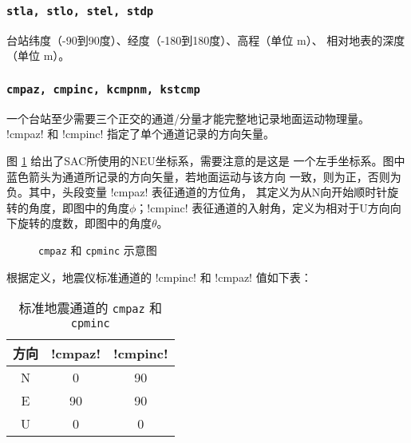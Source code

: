 \subsubsection{\texttt{stla, stlo, stel\dag, stdp\dag}}
台站纬度（-90到90度）、经度（-180到180度）、高程（单位 \si{m}）、
相对地表的深度（单位 \si{m}）。

\subsubsection{\texttt{cmpaz, cmpinc, kcmpnm, kstcmp}}
一个台站至少需要三个正交的通道/分量才能完整地记录地面运动物理量。
!cmpaz! 和 !cmpinc! 指定了单个通道记录的方向矢量。

图 \ref{fig:cmpaz-cmpinc} 给出了SAC所使用的NEU坐标系，需要注意的是这是
一个左手坐标系。图中蓝色箭头为通道所记录的方向矢量，若地面运动与该方向
一致，则为正，否则为负。其中，头段变量 !cmpaz! 表征通道的方位角，
其定义为从N向开始顺时针旋转的角度，即图中的角度$\phi$；!cmpinc!
表征通道的入射角，定义为相对于U方向向下旋转的度数，即图中的角度$\theta$。

\begin{figure}[H]
\centering
{}
\caption{\texttt{cmpaz} 和 \texttt{cpminc} 示意图}
\label{fig:cmpaz-cmpinc}
\end{figure}

根据定义，地震仪标准通道的 !cmpinc! 和 !cmpaz! 值如下表：
\begin{table}[H]
\caption{标准地震通道的 \texttt{cmpaz} 和 \texttt{cpminc}}
\label{table:neu-cmpaz-cmpinc}
\centering
\begin{tabular}{ccc}
\toprule
方向    &   !cmpaz!   &   !cmpinc!  \\
\midrule
N       &   0       &   90          \\
E       &   90      &   90          \\
U       &   0       &   0           \\
\bottomrule
\end{tabular}
\end{table}

